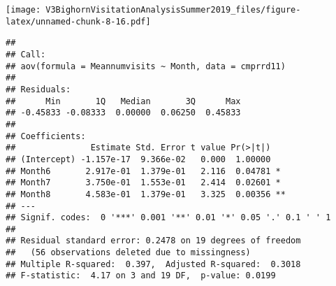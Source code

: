 \documentclass[]{article}
\newenvironment{Shaded}{\begin{snugshade}}{\end{snugshade}}
\newcommand{\CommentTok}[1]{\textcolor[rgb]{0.56,0.35,0.01}{\textit{#1}}}
\newcommand{\DataTypeTok}[1]{\textcolor[rgb]{0.13,0.29,0.53}{#1}}
\newcommand{\KeywordTok}[1]{\textcolor[rgb]{0.13,0.29,0.53}{\textbf{#1}}}
\newcommand{\NormalTok}[1]{#1}
\newcommand{\OperatorTok}[1]{\textcolor[rgb]{0.81,0.36,0.00}{\textbf{#1}}}
\newcommand{\StringTok}[1]{\textcolor[rgb]{0.31,0.60,0.02}{#1}}
\begin{document}
\begin{Shaded}
\end{Shaded}

\texttt{[image: V3BighornVisitationAnalysisSummer2019\_files/figure-latex/unnamed-chunk-8-16.pdf]}

\begin{Shaded}
\end{Shaded}

\begin{verbatim}
## 
## Call:
## aov(formula = Meannumvisits ~ Month, data = cmprrd11)
## 
## Residuals:
##      Min       1Q   Median       3Q      Max 
## -0.45833 -0.08333  0.00000  0.06250  0.45833 
## 
## Coefficients:
##               Estimate Std. Error t value Pr(>|t|)   
## (Intercept) -1.157e-17  9.366e-02   0.000  1.00000   
## Month6       2.917e-01  1.379e-01   2.116  0.04781 * 
## Month7       3.750e-01  1.553e-01   2.414  0.02601 * 
## Month8       4.583e-01  1.379e-01   3.325  0.00356 **
## ---
## Signif. codes:  0 '***' 0.001 '**' 0.01 '*' 0.05 '.' 0.1 ' ' 1
## 
## Residual standard error: 0.2478 on 19 degrees of freedom
##   (56 observations deleted due to missingness)
## Multiple R-squared:  0.397,  Adjusted R-squared:  0.3018 
## F-statistic:  4.17 on 3 and 19 DF,  p-value: 0.0199
\end{verbatim}
\end{document}

